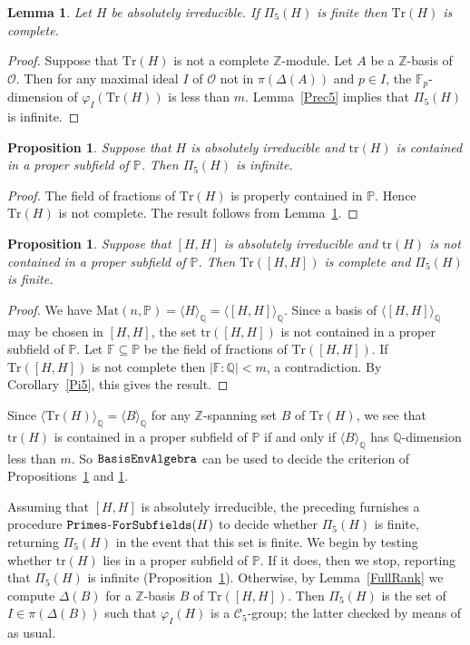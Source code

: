 \documentclass[11pt]{amsart}
\newtheorem{lemma}[theorem]{Lemma}
\newtheorem{proposition}[theorem]{Proposition}
\theoremstyle{definition}
\theoremstyle{remark}
\newcommand{\F}{\mathbb{F}}
\newcommand{\Z}{\mathbb{Z}}
\newcommand{\Q}{\mathbb{Q}}
\renewcommand{\P}{\mathbb{P}}
\newcommand{\tr}{\mathrm{tr}}
\newcommand{\calc}{\mathscr{C}}
\begin{document}
\begin{lemma} 
\label{NotFull} 
Let $H$ be absolutely irreducible. If $\Pi_5(H)$ is finite then
$\mathrm{Tr}(H)$ is complete. 
\end{lemma}
\begin{proof}
Suppose that  $\mathrm{Tr}(H)$ is not a complete $\Z$-module.
Let $A$ be a $\Z$-basis of $\mathcal O$.
 Then for any maximal ideal $I$ of $\mathcal O$ not in
$\pi(\Delta(A))$ and $p\in I$, the $\F_p$-dimension 
of $\varphi_I(\mathrm{Tr}(H))$ is less than $m$.
 Lemma~\ref{Prec5} implies that  $\Pi_5(H)$ is infinite.
\end{proof}

\begin{proposition}
\label{Pi5Infinite}
Suppose that $H$ is absolutely irreducible and $\tr(H)$ is 
contained in a proper subfield of $\P$. Then $\Pi_5(H)$ 
is infinite.
\end{proposition}
\begin{proof}
The field of fractions of $\mathrm{Tr}(H)$ is properly contained 
in $\P$. Hence $\mathrm{Tr}(H)$ is not complete. The result follows 
from Lemma~\ref{NotFull}.
\end{proof}

\begin{proposition}
\label{Pi5Finite}
Suppose that $[H,H]$ is absolutely irreducible and $\tr(H)$ is 
not contained in a proper subfield of $\P$. Then 
$\mathrm{Tr}([H,H])$ is complete and $\Pi_5(H)$ is finite.
\end{proposition}
\begin{proof}
We have $\mathrm{Mat}(n,\P)=\langle H \rangle_\Q =
 \langle [H,H] \rangle_\Q$. Since a basis of 
$\langle [H,H] \rangle_\Q$ may be chosen in $[H,H]$, 
the set $\tr([H,H])$ is not contained in a proper 
subfield of $\P$. Let $\F \subseteq \P$ be the field of 
fractions of $\mathrm{Tr}([H,H])$. If $\mathrm{Tr}([H,H])$ 
is not complete then $|\F : \Q| <m$, a contradiction.
By  Corollary~\ref{Pi5}, this gives the result.
\end{proof}

Since $\langle \mathrm{Tr}(H)\rangle_\Q= \langle B\rangle_\Q$ for any 
 $\Z$-spanning set $B$ of $\mathrm{Tr}(H)$, we see that $\tr(H)$ is 
contained in a proper subfield of $\P$ if and only if 
$\langle B\rangle_\Q$ has $\Q$-dimension less than $m$. So
$\tt BasisEnvAlgebra$ can be used to decide the criterion of 
Propositions~\ref{Pi5Infinite} and \ref{Pi5Finite}.

Assuming that $[H,H]$ is  absolutely irreducible, the preceding 
furnishes a procedure ${\tt Primes}$-${\tt ForSubfields}(H)$
 to decide whether $\Pi_5(H)$ is finite, returning $\Pi_5(H)$ 
in the event that this set is finite. We begin by testing
whether $\tr(H)$ lies in a proper subfield of $\P$. If it does, 
then we stop, reporting that  $\Pi_5(H)$ is infinite 
(Proposition~\ref{Pi5Infinite}). Otherwise, by Lemma~\ref{FullRank}
we compute $\Delta(B)$ for a $\Z$-basis $B$ of $\mathrm{Tr}([H,H])$.
Then $\Pi_5(H)$ is the set of $I \in \pi(\Delta(B))$ such that 
$\varphi_I(H)$ is a $\calc_5$-group; the latter checked by means of
\cite{NSrecog} as usual.
\end{document}
